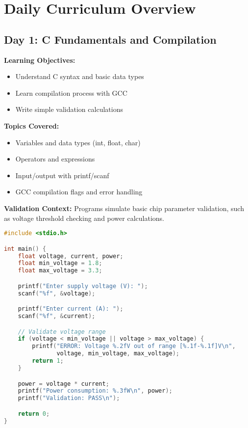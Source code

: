 \documentclass[11pt,a4paper]{article}
\begin{document}
\section{Daily Curriculum Overview}

\subsection{Day 1: C Fundamentals and Compilation}

\textbf{Learning Objectives:}
\begin{itemize}
    \item Understand C syntax and basic data types
    \item Learn compilation process with GCC
    \item Write simple validation calculations
\end{itemize}

\textbf{Topics Covered:}
\begin{itemize}
    \item Variables and data types (int, float, char)
    \item Operators and expressions
    \item Input/output with printf/scanf
    \item GCC compilation flags and error handling
\end{itemize}

\textbf{Validation Context:}
Programs simulate basic chip parameter validation, such as voltage threshold checking and power calculations.

\begin{lstlisting}[language=C, caption=Day 1 Example: Voltage Validator]
#include <stdio.h>

int main() {
    float voltage, current, power;
    float min_voltage = 1.8;
    float max_voltage = 3.3;

    printf("Enter supply voltage (V): ");
    scanf("%f", &voltage);

    printf("Enter current (A): ");
    scanf("%f", &current);

    // Validate voltage range
    if (voltage < min_voltage || voltage > max_voltage) {
        printf("ERROR: Voltage %.2fV out of range [%.1f-%.1f]V\n",
               voltage, min_voltage, max_voltage);
        return 1;
    }

    power = voltage * current;
    printf("Power consumption: %.3fW\n", power);
    printf("Validation: PASS\n");

    return 0;
}
\end{lstlisting}
\end{document}
